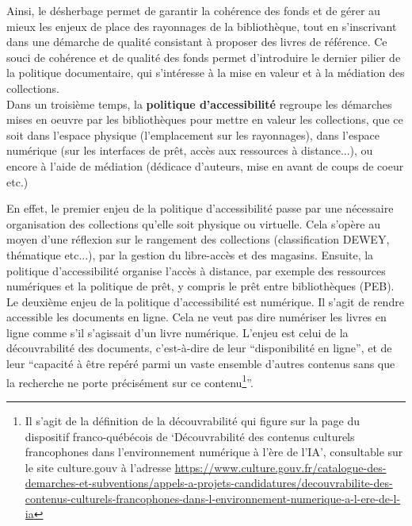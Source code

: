 Ainsi, le désherbage permet de garantir la cohérence des fonds et de gérer au mieux les enjeux de place des rayonnages de la bibliothèque, tout en s'inscrivant dans une démarche de qualité consistant à proposer des livres de référence. 
Ce souci de cohérence et de qualité des fonds permet d'introduire le dernier pilier de la politique documentaire, qui s'intéresse à la mise en valeur et à la médiation des collections.\\

Dans un troisième temps, la \textbf{politique d'accessibilité} regroupe les démarches mises en oeuvre par les bibliothèques pour mettre en valeur les collections, que ce soit dans l'espace physique (l'emplacement sur les rayonnages),  dans l'espace numérique (sur les interfaces de prêt, accès aux ressources à distance...), ou encore à l'aide de médiation (dédicace d'auteurs, mise en avant de coups de coeur etc.)

En effet, le premier enjeu de la politique d'accessibilité passe par une nécessaire organisation des collections qu'elle soit physique ou virtuelle. Cela s'opère au moyen d'une réflexion sur le rangement des collections (classification DEWEY, thématique etc...), par la gestion du libre-accès et des magasins. Ensuite, la politique d'accessibilité organise l'accès à distance, par exemple des ressources numériques et la politique de prêt, y compris le prêt entre bibliothèques (PEB). \\

Le deuxième enjeu de la politique d'accessibilité est numérique. Il s'agit de rendre accessible les documents en ligne. Cela ne veut pas dire numériser les livres en ligne comme s'il s'agissait d'un livre numérique. L'enjeu est celui de la découvrabilité des documents, c'est-à-dire de leur \enquote{disponibilité en ligne}, et de leur \enquote{capacité à être repéré parmi un vaste ensemble d'autres contenus sans que la recherche ne porte précisément sur ce contenu\footnote{Il s'agit de la définition de la découvrabilité qui figure sur la page du dispositif franco-québécois de \enquote{Découvrabilité des contenus culturels francophones dans l’environnement numérique à l’ère de l’IA}, consultable sur le site culture.gouv à l'adresse \url{https://www.culture.gouv.fr/catalogue-des-demarches-et-subventions/appels-a-projets-candidatures/decouvrabilite-des-contenus-culturels-francophones-dans-l-environnement-numerique-a-l-ere-de-l-ia}}}.\\

